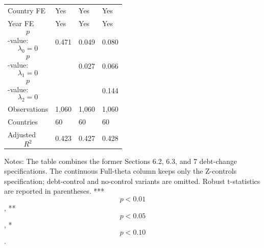 \begin{table}[H]
\begin{threeparttable}
\begin{tabularx}{\textwidth}{lYYY}
Country FE & Yes & Yes & Yes \\
Year FE & Yes & Yes & Yes \\
$$p$$-value: $$\lambda_0=0$$ & 0.471 & 0.049 & 0.080 \\
$$p$$-value: $$\lambda_1=0$$ &  & 0.027 & 0.066 \\
$$p$$-value: $$\lambda_2=0$$ &  &  & 0.144 \\
Observations & 1,060 & 1,060 & 1,060 \\
Countries & 60 & 60 & 60 \\
Adjusted $$R^2$$ & 0.423 & 0.427 & 0.428 \\
\bottomrule
\end{tabularx}
\begin{tablenotes}[flushleft]\footnotesize
\item Notes: The table combines the former Sections 6.2, 6.3, and 7 debt-change specifications. The continuous Full-theta column keeps only the Z-controls specification; debt-control and no-control variants are omitted. Robust t-statistics are reported in parentheses. *** $$p<0.01$$, ** $$p<0.05$$, * $$p<0.10$$.
\end{tablenotes}
\end{threeparttable}
\end{table}
